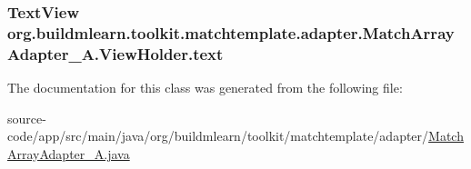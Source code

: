 \subsubsection[{\texorpdfstring{text}{text}}]{\setlength{\rightskip}{0pt plus 5cm}Text\+View org.\+buildmlearn.\+toolkit.\+matchtemplate.\+adapter.\+Match\+Array\+Adapter\+\_\+\+A.\+View\+Holder.\+text}\hypertarget{classorg_1_1buildmlearn_1_1toolkit_1_1matchtemplate_1_1adapter_1_1MatchArrayAdapter__A_1_1ViewHolder_a5853d6adf91720db5166a4ddd81a3cca}{}\label{classorg_1_1buildmlearn_1_1toolkit_1_1matchtemplate_1_1adapter_1_1MatchArrayAdapter__A_1_1ViewHolder_a5853d6adf91720db5166a4ddd81a3cca}


The documentation for this class was generated from the following file\+:\begin{DoxyCompactItemize}
\item 
source-\/code/app/src/main/java/org/buildmlearn/toolkit/matchtemplate/adapter/\hyperlink{MatchArrayAdapter__A_8java}{Match\+Array\+Adapter\+\_\+\+A.\+java}\end{DoxyCompactItemize}
